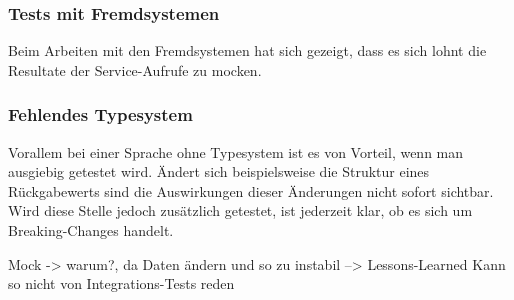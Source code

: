 \subsubsection{Tests mit Fremdsystemen}
\label{fazit:Tests mit Fremdsystemen}
Beim Arbeiten mit den Fremdsystemen hat sich gezeigt, dass es sich lohnt die Resultate der Service-Aufrufe zu mocken.

\subsubsection{Fehlendes Typesystem}
\label{fazit:Fehlendes Typesystem}
Vorallem bei einer Sprache ohne Typesystem ist es von Vorteil, wenn man ausgiebig getestet wird. Ändert sich beispielsweise die Struktur eines Rückgabewerts sind die Auswirkungen dieser Änderungen nicht sofort sichtbar. Wird diese Stelle jedoch zusätzlich getestet, ist jederzeit klar, ob es sich um Breaking-Changes handelt.


Mock -> warum?, da Daten ändern und so zu instabil --> Lessons-Learned
Kann so nicht von Integrations-Tests reden